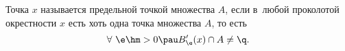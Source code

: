 \label{pt}
Точка $x$ называется предельной точкой множества $A$, если в~любой проколотой окрестности $x$ есть хоть одна точка множества $A$, то есть
\[  \forall\  \e\hm>0\pau B'_\e(x)\cap A\neq \q.\]
 